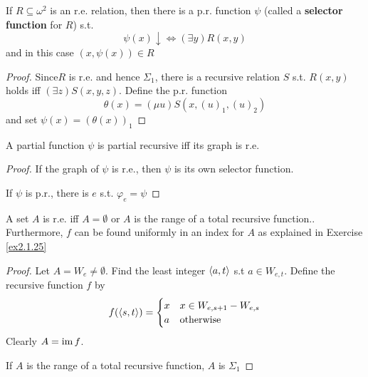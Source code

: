 \documentclass[11pt]{article}
\begin{document}
\begin{theorem}
\label{thm2.1.6}
If \(R\subseteq\omega^2\) is an r.e. relation, then there is a p.r. function
\(\psi\) (called a \textbf{selector function} for \(R\)) s.t.
\begin{equation*}
\psi(x)\downarrow\Leftrightarrow(\exists y)R(x,y)
\end{equation*}
and in this case \((x,\psi(x))\in R\)
\end{theorem}

\begin{proof}
Since\(R\) is r.e. and hence \(\Sigma_1\), there is a recursive relation
\(S\) s.t. \(R(x,y)\) holds iff \((\exists z)S(x,y,z)\). Define the p.r.
function
\begin{equation*}
\theta(x)=(\mu u)S(x,(u)_1,(u)_2)
\end{equation*}
and set \(\psi(x)=(\theta(x))_1\)
\end{proof}

\begin{theorem}
\label{thm2.1.7}
A partial function \(\psi\) is partial recursive iff its graph is r.e.
\end{theorem}

\begin{proof}
If the graph of \(\psi\) is r.e., then \(\psi\) is its own selector function.

If \(\psi\) is p.r., there is \(e\) s.t. \(\varphi_e=\psi\)
\end{proof}

\begin{theorem}
\label{thm2.1.8}
A set \(A\) is r.e. iff \(A=\emptyset\) or \(A\) is the range of a total
recursive function.. Furthermore, \(f\) can be found uniformly in an index
for \(A\) as explained in Exercise \ref{ex2.1.25}
\end{theorem}

\begin{proof}
Let \(A=W_e\neq\emptyset\). Find the least integer \(\langle a,t\rangle\) s.t
\(a\in W_{e,t}\). Define the recursive function \(f\) by
\begin{equation*}
f(\langle s,t\rangle)=
\begin{cases}
x&x\in W_{e,s+1}-W_{e,s}\\
a&\text{otherwise}
\end{cases}
\end{equation*}
Clearly \(A=\operatorname{im} f\).

If \(A\) is the range of a total recursive function, \(A\) is \(\Sigma_1\)
\end{proof}
\end{document}
